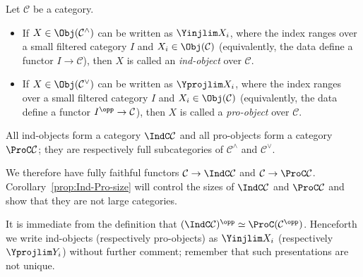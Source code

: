 \begin{definition}
	Let $\mathcal{C}$ be a category.
	\begin{itemize}
		\item If $X\in\Obj(\mathcal{C}^\wedge)$ can be written as $\Yinjlim X_i$, where the index ranges over a small filtered category $I$ and $X_i\in\Obj(\mathcal{C})$ (equivalently, the data define a functor $I\to\mathcal{C}$), then $X$ is called an \emph{ind-object} over $\mathcal{C}$.

		\item If $X\in\Obj(\mathcal{C}^\vee)$ can be written as $\Yprojlim X_i$, where the index ranges over a small filtered category $I$ and $X_i\in\Obj(\mathcal{C})$ (equivalently, the data define a functor $I^{\opp}\to\mathcal{C}$), then $X$ is called a \emph{pro-object} over $\mathcal{C}$.
	\end{itemize}

	All ind-objects form a category $\IndC\mathcal{C}$ and all pro-objects form a category $\ProC\mathcal{C}$; they are respectively full subcategories of $\mathcal{C}^\wedge$ and $\mathcal{C}^\vee$.
\end{definition}

We therefore have fully faithful functors
$\mathcal{C}\to\IndC\mathcal{C}$ and
$\mathcal{C}\to\ProC\mathcal{C}$. Corollary~\ref{prop:Ind-Pro-size} will control the sizes of $\IndC\mathcal{C}$ and $\ProC\mathcal{C}$ and show that they are not large categories.

It is immediate from the definition that
$(\IndC\mathcal{C})^{\opp}\simeq\ProC(\mathcal{C}^{\opp})$.
Henceforth we write ind-objects (respectively pro-objects) as $\Yinjlim X_i$ (respectively $\Yprojlim Y_i$) without further comment; remember that such presentations are not unique.

